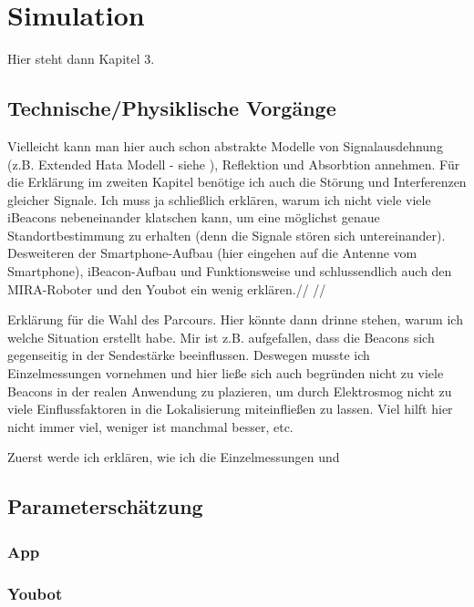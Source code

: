 \chapter{Simulation}
Hier steht dann Kapitel 3.

\section{Technische/Physiklische Vorgänge}
Vielleicht kann man hier auch schon abstrakte Modelle von Signalausdehnung (z.B. Extended Hata Modell - siehe ), Reflektion und Absorbtion annehmen. Für die Erklärung im zweiten Kapitel benötige ich auch die Störung und Interferenzen gleicher Signale. Ich muss ja schließlich erklären, warum ich nicht viele viele iBeacons nebeneinander klatschen kann, um eine möglichst genaue Standortbestimmung zu erhalten (denn die Signale stören sich untereinander).  Desweiteren der Smartphone-Aufbau (hier eingehen auf die Antenne vom Smartphone), iBeacon-Aufbau und Funktionsweise und schlussendlich auch den MIRA-Roboter und den Youbot ein wenig erklären.// //

Erklärung für die Wahl des Parcours. Hier könnte dann drinne stehen, warum ich welche Situation erstellt habe. Mir ist z.B. aufgefallen, dass die Beacons sich gegenseitig in der Sendestärke beeinflussen. Deswegen musste ich Einzelmessungen vornehmen und hier ließe sich auch begründen nicht zu viele Beacons in der realen Anwendung zu plazieren, um durch Elektrosmog nicht zu viele Einflussfaktoren in die Lokalisierung miteinfließen zu lassen. Viel hilft hier nicht immer viel, weniger ist manchmal besser, etc.

Zuerst werde ich erklären, wie ich die Einzelmessungen und 

\section{Parameterschätzung}
\subsection{App}
\subsection{Youbot}


